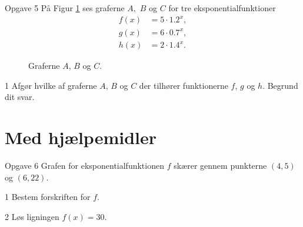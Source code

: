\begin{opgavetekst}{Opgave 5}
	På Figur \ref{fig:grafer} ses graferne $A,$ $B$ og $C$ for tre eksponentialfunktioner
	\begin{align*}
		f(x) &= 5\cdot 1.2^x,\\
		g(x) &= 6 \cdot 0.7^x,  \\
		h(x) &= 2 \cdot 1.4^x.
	\end{align*}
	\begin{figure}[H]
		\centering
		\caption{Graferne $A$, $B$ og $C$.}
		\label{fig:grafer}
	\end{figure}
	\phantom{h}
\end{opgavetekst}
\begin{delopgave}{}{1}
	Afgør hvilke af graferne $A$, $B$ og $C$ der tilhører funktionerne $f$, $g$ og $h$. Begrund dit svar.
\end{delopgave}


\newpage

\section*{Med hjælpemidler}

\begin{opgavetekst}{Opgave 6}
	Grafen for eksponentialfunktionen $f$ skærer gennem punkterne $(4,5)$ og $(6,22)$.
\end{opgavetekst}
\begin{delopgave}{}{1}
	Bestem forskriften for $f$. 
\end{delopgave}
\begin{delopgave}{}{2}
	Løs ligningen $f(x) = 30$. 
\end{delopgave}

